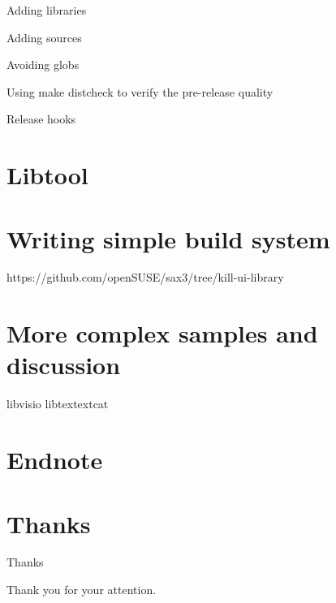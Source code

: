 \documentclass{beamer}
\begin{document}
Adding libraries

Adding sources

Avoiding globs

Using make distcheck to verify the pre-release quality

Release hooks

\section{Libtool}

\section{Writing simple build system}
https://github.com/openSUSE/sax3/tree/kill-ui-library

\section{More complex samples and discussion}
libvisio
libtextextcat

\section{Endnote}

\section{Thanks}

\begin{frame}{Thanks}
	\begin{center}
	Thank you for your attention.
	\end{center}
\end{frame}
\end{document}
